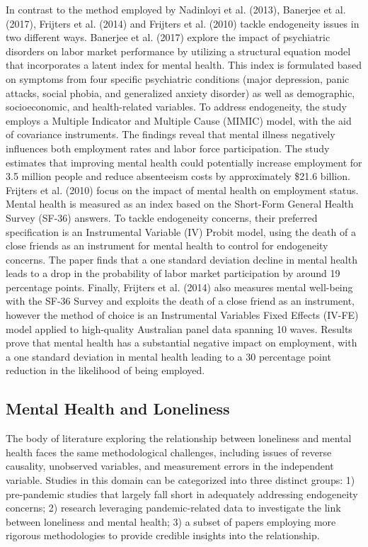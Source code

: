     In contrast to the method employed by Nadinloyi et al. (2013), Banerjee et al. (2017), Frijters et al. (2014) and Frijters et al. (2010) tackle endogeneity issues in two different ways. Banerjee et al. (2017) explore the impact of psychiatric disorders on labor market performance by utilizing a structural equation model that incorporates a latent index for mental health. This index is formulated based on symptoms from four specific psychiatric conditions (major depression, panic attacks, social phobia, and generalized anxiety disorder) as well as demographic, socioeconomic, and health-related variables. To address endogeneity, the study employs a Multiple Indicator and Multiple Cause (MIMIC) model, with the aid of covariance instruments. The findings reveal that mental illness negatively influences both employment rates and labor force participation. The study estimates that improving mental health could potentially increase employment for 3.5 million people and reduce absenteeism costs by approximately \$21.6 billion.
    Frijters et al. (2010) focus on the impact of mental health on employment status. Mental health is measured as an index based on the Short-Form General Health Survey (SF-36) answers. To tackle endogeneity concerns, their preferred specification is an Instrumental Variable (IV) Probit model, using the death of a close friends as an instrument for mental health to control for endogeneity concerns. The paper finds that a one standard deviation decline in mental health leads to a drop in the probability of labor market participation by around 19 percentage points. 
    Finally, Frijters et al. (2014) also measures mental well-being with the SF-36 Survey and exploits the death of a close friend as an instrument, however the method of choice is an Instrumental Variables Fixed Effects (IV-FE) model applied to high-quality Australian panel data spanning 10 waves. Results prove that mental health has a substantial negative impact on employment, with a one standard deviation in mental health leading to a 30 percentage point reduction in the likelihood of being employed. 


\subsection{Mental Health and Loneliness}
    The body of literature exploring the relationship between loneliness and mental health faces the same methodological challenges, including issues of reverse causality, unobserved variables, and measurement errors in the independent variable. Studies in this domain can be categorized into three distinct groups: 
    1) pre-pandemic studies that largely fall short in adequately addressing endogeneity concerns; 
    2) research leveraging pandemic-related data to investigate the link between loneliness and mental health;
    3) a subset of papers employing more rigorous methodologies to provide credible insights into the relationship.

